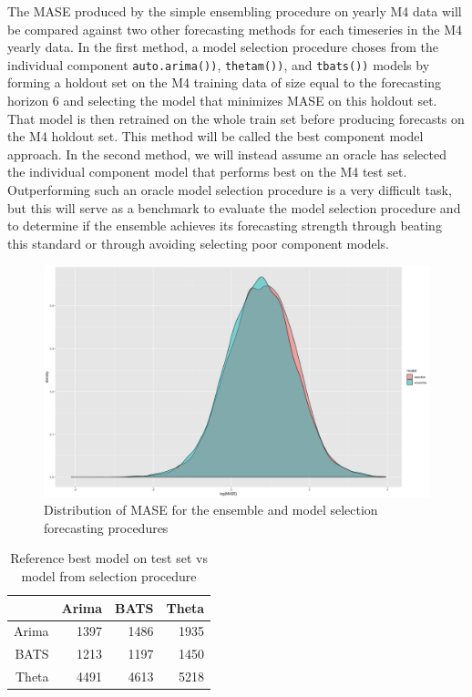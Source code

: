 \documentclass[11pt,3p,review,authoryear]{elsarticle}
\begin{document}
The MASE produced by the simple ensembling procedure on yearly M4 data will be compared against two other forecasting methods for each timeseries in the M4 yearly data. In the first method, a model selection procedure choses from the individual component \texttt{auto.arima())}, \texttt{thetam())}, and \texttt{tbats())} models by forming a holdout set on the M4 training data of size equal to the forecasting horizon 6 and selecting the model that minimizes MASE on this holdout set. That model is then retrained on the whole train set before producing forecasts on the M4 holdout set. This method will be called the best component model approach. In the second method, we will instead assume an oracle has selected the individual component model that performs best on the M4 test set. Outperforming such an oracle model selection procedure is a very difficult task, but this will serve as a benchmark to evaluate the model selection procedure and to determine if the ensemble achieves its forecasting strength through beating this standard or through avoiding selecting poor component models.


\begin{figure}[h]
\centering
\includegraphics[width=1.0\textwidth]{distribution}
\caption{Distribution of MASE for the ensemble and model selection forecasting procedures}
\end{figure}

\begin{table}[ht]
\centering
\begin{tabular}{rrrr}
  \hline
 & Arima & BATS & Theta \\ 
  \hline
Arima & 1397 & 1486 & 1935 \\ 
  BATS & 1213 & 1197 & 1450 \\ 
  Theta & 4491 & 4613 & 5218 \\ 
   \hline
\end{tabular}
\caption{Reference best model on test set vs model from selection procedure} 
\end{table}
\end{document}
